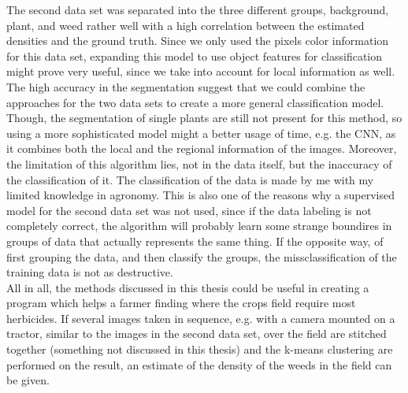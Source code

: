 The second data set was separated into the three different groups, background, plant, and weed rather well with a high correlation between the estimated densities and the ground truth. Since we only used the pixels color information for this data set, expanding this model to use object features for classification might prove very useful, since we take into account for local information as well. The high accuracy in the segmentation suggest that we could combine the approaches for the two data sets to create a more general classification model. Though, the segmentation of single plants are still not present for this method, so using a more sophisticated model might a better usage of time, e.g. the CNN, as it combines both the local and the regional information of the images. Moreover, the limitation of this algorithm lies, not in the data itself, but the inaccuracy of the classification of it. The classification of the data is made by me with my limited knowledge in agronomy. This is also one of the reasons why a supervised model for the second data set was not used, since if the data labeling is not completely correct, the algorithm will probably learn some strange boundires in groups of data that actually represents the same thing. If the opposite way, of first grouping the data, and then classify the groups, the missclassification of the training data is not as destructive.\\

All in all, the methods discussed in this thesis could be useful in creating a program which helps a farmer finding where the crops field require most herbicides. If several images taken in sequence, e.g. with a camera mounted on a tractor, similar to the images in the second data set, over the field are stitched together (something not discussed in this thesis) and the k-means clustering are performed on the result, an estimate of the density of the weeds in the field can be given.
